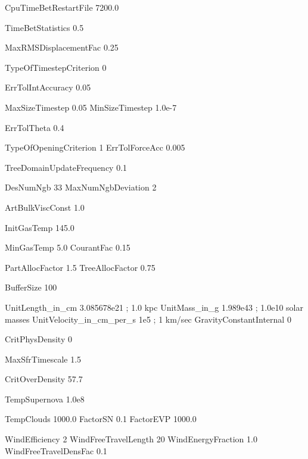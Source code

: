 CpuTimeBetRestartFile  7200.0  %

TimeBetStatistics      0.5

MaxRMSDisplacementFac  0.25


TypeOfTimestepCriterion 0   
	                    
ErrTolIntAccuracy       0.05  


MaxSizeTimestep        0.05
MinSizeTimestep        1.0e-7



ErrTolTheta             0.4

TypeOfOpeningCriterion  1
ErrTolForceAcc          0.005



TreeDomainUpdateFrequency    0.1



DesNumNgb           33
MaxNumNgbDeviation  2

ArtBulkViscConst    1.0

InitGasTemp         145.0  %



MinGasTemp          5.0    
CourantFac          0.15



PartAllocFactor       1.5  
TreeAllocFactor       0.75

BufferSize              100




UnitLength_in_cm         3.085678e21        ;  1.0 kpc
UnitMass_in_g            1.989e43           ;  1.0e10 solar masses
UnitVelocity_in_cm_per_s 1e5                ;  1 km/sec
GravityConstantInternal  0









CritPhysDensity     0       %

MaxSfrTimescale     1.5     %


CritOverDensity      57.7    %
 
TempSupernova        1.0e8   %
 
TempClouds           1000.0   %
FactorSN             0.1
FactorEVP            1000.0



WindEfficiency                     2
WindFreeTravelLength               20
WindEnergyFraction                 1.0
WindFreeTravelDensFac              0.1
